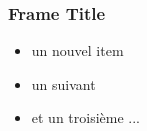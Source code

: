 
\begin{frame}[c]
  \frametitle{Frame Title}


\begin{block}
 
 \begin{itemize}
  \item un nouvel item
  \item un suivant
  \item et un troisième ...
 \end{itemize}

\end{block}


\end{frame}
